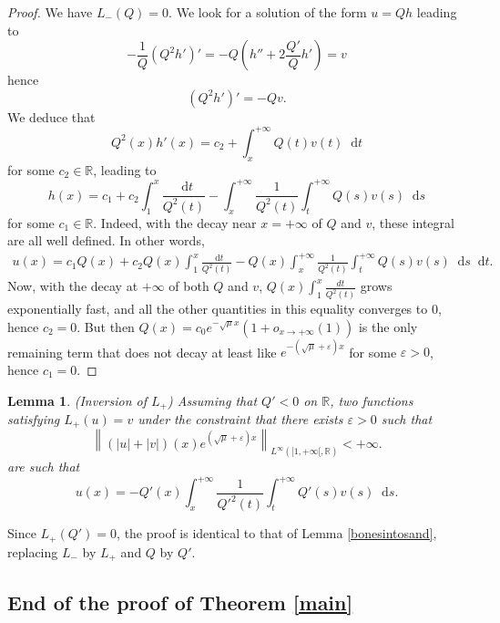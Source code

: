 \documentclass[11 pt]{amsart}
\newtheorem{lem}{Lemma}[section]
\theoremstyle{definition}
\theoremstyle{remark}
\numberwithin{equation}{section}
\newcommand{\dd}{\mathop{}\!\mathrm{d}}
\begin{document}
\begin{proof}
  We have $L_- (Q) = 0$. We look for a solution of the form $u = Q h$ leading
  to
  \[ - \frac{1}{Q} (Q^2 h')' = - Q \left( h'' +  2
     \frac{Q'}{Q}  h' \right) = v \]
  hence
  \[ (Q^2 h')' = - Q  v. \]
  We deduce that
  \[ Q^2(x) h' (x) = c_2 + \int_x^{+ \infty} Q (t) v (t) \dd t
  \]
  for some $c_2 \in \mathbb{R}$, leading to
  \[ h (x) = c_1 + c_2 \int_1^x \frac{\dd t}{Q^2 (t) } - \int_x^{+
     \infty} \frac{1}{Q^2 (t) } \int_t^{+ \infty} Q (s) v
     (s) \dd s \]
  for some $c_1 \in \mathbb{R}$. Indeed, with the decay near $x = + \infty$ of
  $Q$ and $v$, these integral are all well defined. In other words,
  \begin{eqnarray*}
u (x) = c_1 Q (x) + c_2 Q (x) \int_1^x \frac{\dd t}{Q^2 (t) } - Q
    (x) \int_x^{+ \infty} \frac{1}{Q^2 (t)} \int_t^{+ \infty} Q (s)
    v (s) \dd s \dd t.
  \end{eqnarray*}
  Now, with the decay at $+ \infty$ of both $Q$ and $v$, $Q (x) \int_1^x
  \frac{d t}{Q^2 (t) }$ grows exponentially fast, and all the other
  quantities in this equality converges to $0$, hence $c_2 = 0$. But then $Q(x) = c_0
  e^{-\sqrt{\mu} x} (1 + o_{x \rightarrow + \infty}
  (1))$ is the only remaining term that does not decay at least like $e^{-
  \left( \sqrt{\mu} + \varepsilon \right) x}$ for some $\varepsilon > 0$, hence
  $c_1 = 0$.
\end{proof}

\begin{lem}(Inversion of $L_+$) \label{InvL+}
Assuming that $Q'<0$ on $\mathbb{R}$, two functions satisfying $L_+ (u) = v$ under the constraint that there exists $\varepsilon > 0$ such that
  \[ \left\| (| u | + | v |) (x) e^{\left( \sqrt{\mu} + \varepsilon \right) x}
     \right\|_{L^{\infty} ([1, + \infty [, \mathbb{R})} < + \infty. \]
are such that  \[ u(x) = - Q' (x) \int_x^{+ \infty} \frac{1}{Q'^2 (t) }
     \int_t^{+ \infty} Q' (s)  v (s) \dd s. \]
\end{lem}

Since $L_+(Q')=0$, the proof is identical to that of Lemma \ref{bonesintosand}, replacing $L_-$ by $L_+$ and $Q$ by $Q'$.


\subsection{End of the proof of Theorem \ref{main}}
\end{document}
